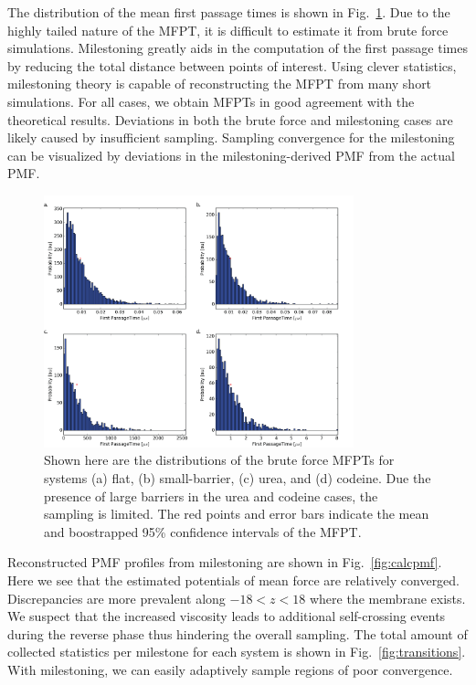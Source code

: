    \par The distribution of the mean first passage times is shown in Fig.~\ref{fig:mfpts}. Due to the highly tailed nature of the MFPT, it is difficult to estimate it from brute force simulations. Milestoning greatly aids in the computation of the first passage times by reducing the total distance between points of interest. Using clever statistics, milestoning theory is capable of reconstructing the MFPT from many short simulations. For all cases, we obtain MFPTs in good agreement with the theoretical results. Deviations in both the brute force and milestoning cases are likely caused by insufficient sampling. Sampling convergence for the milestoning can be visualized by deviations in the milestoning-derived PMF from the actual PMF.

    \begin{figure}[!htbp]
    \begin{center}
        \includegraphics[width=0.8\textwidth]{Figures/mfptdist}
        \caption[Distributions of brute force MFPTS for systems (a) flat, (b) small-barrier, (c) urea, and (d) codeine]{Shown here are the distributions of the brute force MFPTs for systems (a) flat, (b) small-barrier, (c) urea, and (d) codeine. Due the presence of large barriers in the urea and codeine cases, the sampling is limited. The red points and error bars indicate the mean and boostrapped 95\% confidence intervals of the MFPT.}
        \label{fig:mfpts}
    \end{center}
    \end{figure}

    \par Reconstructed PMF profiles from milestoning are shown in Fig.~\ref{fig:calcpmf}. Here we see that the estimated potentials of mean force are relatively converged. Discrepancies are more prevalent along $-18<z<18$ where the membrane exists. We suspect that the increased viscosity leads to additional self-crossing events during the reverse phase thus hindering the overall sampling. The total amount of collected statistics per milestone for each system is shown in Fig.~\ref{fig:transitions}. With milestoning, we can easily adaptively sample regions of poor convergence.

